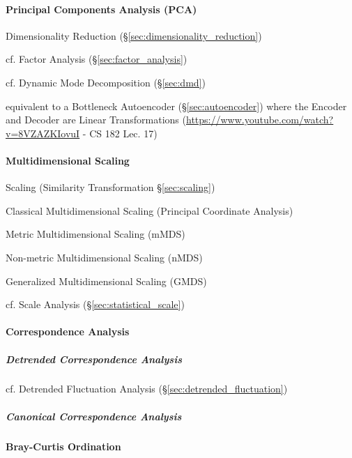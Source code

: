 \paragraph{Principal Components Analysis (PCA)}\label{sec:pca}\hfill

Dimensionality Reduction (\S\ref{sec:dimensionality_reduction})

cf. Factor Analysis (\S\ref{sec:factor_analysis})

cf. Dynamic Mode Decomposition (\S\ref{sec:dmd})

equivalent to a Bottleneck Autoencoder (\S\ref{sec:autoencoder}) where the
Encoder and Decoder are Linear Transformations
(\url{https://www.youtube.com/watch?v=8VZAZKIovuI} - CS 182 Lec. 17)



\paragraph{Multidimensional Scaling}\label{sec:multidimensional_scaling}\hfill

\fist Scaling (Similarity Transformation \S\ref{sec:scaling})

Classical Multidimensional Scaling (Principal Coordinate Analysis)

Metric Multidimensional Scaling (mMDS)

Non-metric Multidimensional Scaling (nMDS)

Generalized Multidimensional Scaling (GMDS)

cf. Scale Analysis (\S\ref{sec:statistical_scale})



\paragraph{Correspondence Analysis}\label{sec:correspondence_analysis}\hfill

\subparagraph{Detrended Correspondence Analysis}
\label{sec:detrended_correspondence}\hfill

\fist cf. Detrended Fluctuation Analysis (\S\ref{sec:detrended_fluctuation})



\subparagraph{Canonical Correspondence Analysis}
\label{sec:canonical_correspondence}\hfill



\paragraph{Bray-Curtis Ordination}\label{sec:bray_curtis_ordination}\hfill

